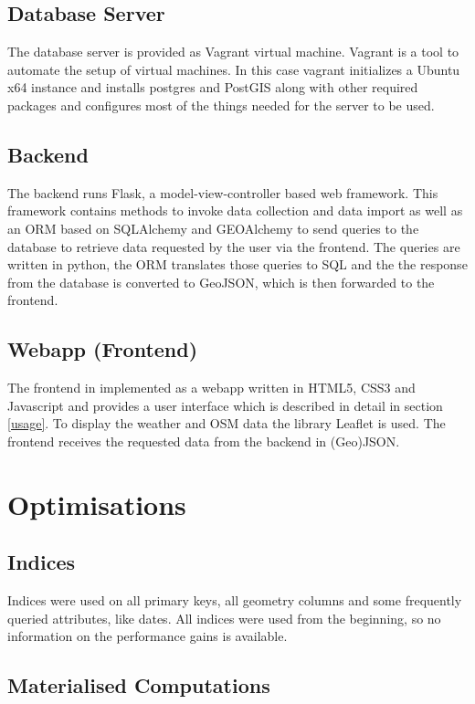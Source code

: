 \documentclass[paper=a4, fontsize=11pt]{article} %
\numberwithin{equation}{section} %
\numberwithin{figure}{section} %
\numberwithin{table}{section} %
\begin{document}
\subsection{Database Server}
The database server is provided as Vagrant virtual machine. Vagrant is a tool to automate the setup of virtual machines. In this case vagrant initializes a Ubuntu x64 instance and installs postgres and PostGIS along with other required packages and configures most of the things needed for the server to be used.
\subsection{Backend}
The backend runs Flask, a model-view-controller based web framework. This framework contains methods to invoke data collection and data import as well as an ORM based on SQLAlchemy and GEOAlchemy to send queries to the database to retrieve data requested by the user via the frontend. The queries are written in python, the ORM translates those queries to SQL and the the response from the database is converted to GeoJSON, which is then forwarded to the frontend.
\subsection{Webapp (Frontend)}\label{subsec:webapp}
The frontend in implemented as a webapp written in HTML5, CSS3 and Javascript and provides a user interface which is described in detail in section \ref{usage}. To display the weather and OSM data the library Leaflet is used. The frontend receives the requested data from the backend in (Geo)JSON.


\section{Optimisations}\label{sec:optimisation}

\subsection{Indices}

Indices were used on all primary keys, all geometry columns and some frequently queried attributes, like dates. All indices were used from the beginning, so no information on the performance gains is available.

\subsection{Materialised Computations}\label{subsec:opticontrib}
\end{document}

